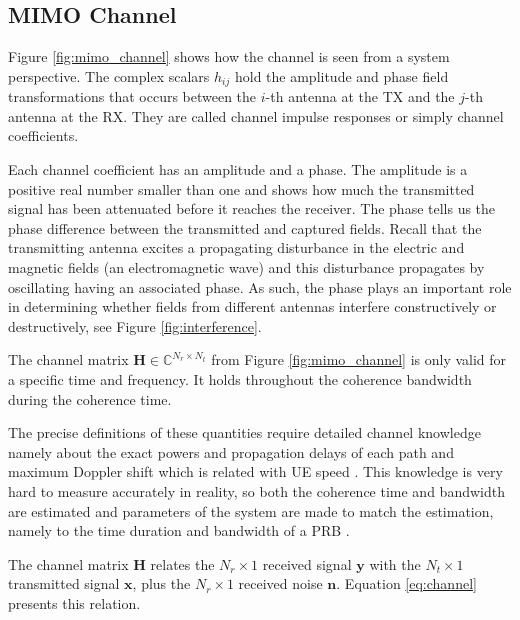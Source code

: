 \subsection*{MIMO Channel}

Figure \ref{fig:mimo_channel} shows how the channel is seen from a system perspective. The complex scalars $h_{ij}$ hold the amplitude and phase field transformations that occurs between the $i$-th antenna at the \ac{TX} and the $j$-th antenna at the \ac{RX}. They are called channel impulse responses or simply channel coefficients.


Each channel coefficient has an amplitude and a phase. The amplitude is a positive real number smaller than one and shows how much the transmitted signal has been attenuated before it reaches the receiver. The phase tells us the phase difference between the transmitted and captured fields. Recall that the transmitting antenna excites a propagating disturbance in the electric and magnetic fields (an electromagnetic wave) and this disturbance propagates by oscillating having an associated phase. As such, the phase plays an important role in determining whether fields from different antennas interfere constructively or destructively, see Figure \ref{fig:interference}.



The channel matrix $\bm{H} \in \mathbb{C}^{N_r \times N_t}$ from Figure \ref{fig:mimo_channel} is only valid for a specific time and frequency. It holds throughout the coherence bandwidth during the coherence time. 

The precise definitions of these quantities require detailed channel knowledge namely about the exact powers and propagation delays of each path and maximum Doppler shift which is related with \ac{UE} speed \cite{Rappaport_wireless_coms,wireless_coms_andrea_goldsmith}. This knowledge is very hard to measure accurately in reality, so both the coherence time and bandwidth are estimated and parameters of the system are made to match the estimation, namely to the time duration and bandwidth of a \ac{PRB} \cite{fundamentals_wireless_david_tse}.

The channel matrix $\bm{H}$ relates the $N_r \times 1$ received signal $\bm{y}$ with the $N_t \times 1$ transmitted signal $\bm{x}$, plus the $N_r \times 1$ received noise $\bm{n}$. Equation \eqref{eq:channel} presents this relation.


